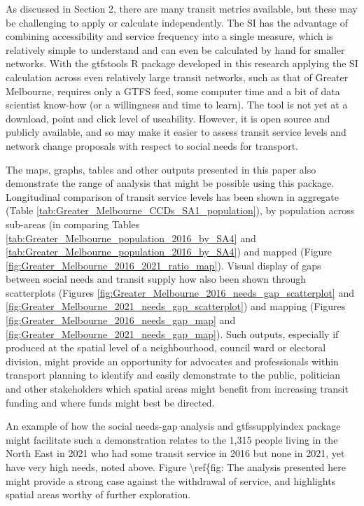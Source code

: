 \documentclass[preprint, 3p,
authoryear]{elsarticle} %
\begin{document}
As discussed in Section 2, there are many transit metrics available, but
these may be challenging to apply or calculate independently. The SI has
the advantage of combining accessibility and service frequency into a
single measure, which is relatively simple to understand and can even be
calculated by hand for smaller networks. With the gtfstools R package
developed in this research applying the SI calculation across even
relatively large transit networks, such as that of Greater Melbourne,
requires only a GTFS feed, some computer time and a bit of data
scientist know-how (or a willingness and time to learn). The tool is not
yet at a download, point and click level of useability. However, it is
open source and publicly available, and so may make it easier to assess
transit service levels and network change proposals with respect to
social needs for transport.

The maps, graphs, tables and other outputs presented in this paper also
demonstrate the range of analysis that might be possible using this
package. Longitudinal comparison of transit service levels has been
shown in aggregate (Table
\ref{tab:Greater_Melbourne_CCDs_SA1_population}), by population across
sub-areas (in comparing Tables
\ref{tab:Greater_Melbourne_population_2016_by_SA4} and
\ref{tab:Greater_Melbourne_population_2016_by_SA4}) and mapped (Figure
\ref{fig:Greater_Melbourne_2016_2021_ratio_map}). Visual display of gaps
between social needs and transit supply how also been shown through
scatterplots (Figures
\ref{fig:Greater_Melbourne_2016_needs_gap_scatterplot} and
\ref{fig:Greater_Melbourne_2021_needs_gap_scatterplot}) and mapping
(Figures \ref{fig:Greater_Melbourne_2016_needs_gap_map} and
\ref{fig:Greater_Melbourne_2021_needs_gap_map}). Such outputs,
especially if produced at the spatial level of a neighbourhood, council
ward or electoral division, might provide an opportunity for advocates
and professionals within transport planning to identify and easily
demonstrate to the public, politician and other stakeholders which
spatial areas might benefit from increasing transit funding and where
funds might best be directed.

An example of how the social needs-gap analysis and gtfssupplyindex
package might facilitate such a demonstration relates to the 1,315
people living in the North East in 2021 who had some transit service in
2016 but none in 2021, yet have very high needs, noted above. Figure
\textbackslash ref\{fig: The analysis presented here might provide a
strong case against the withdrawal of service, and highlights spatial
areas worthy of further exploration.
\end{document}
